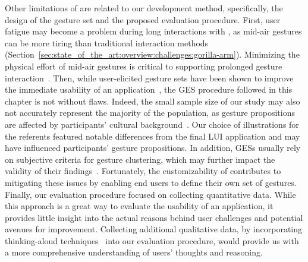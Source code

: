 Other limitations of \lui are related to our development method, specifically, the design of the gesture set and the proposed evaluation procedure.
%
First, user fatigue may become a problem during long interactions with \lui, as mid-air gestures can be more tiring than traditional interaction methods~\cite{Siddhpuria:2017,Jakobsen:2015,Hansberger:2017} (Section~\ref{sec:state_of_the_art:overview:challenges:gorilla-arm}). Minimizing the physical effort of mid-air gestures is critical to supporting prolonged gesture interaction~\cite{Hansberger:2017}.
%
Then, while user-elicited gesture sets have been shown to improve the immediate usability of an application~\cite{Wobbrock:2005}, the GES procedure followed in this chapter is not without flaws.
Indeed, the small sample size of our study may also not accurately represent the majority of the population, as gesture propositions are affected by participants' cultural background~\cite{Archer:1997}. 
Our choice of illustrations for the referents featured notable differences from the final LUI application and may have influenced participants' gesture propositions. 
In addition, GESs usually rely on subjective criteria for gesture clustering, which may further impact the validity of their findings~\cite{Vatavu:2019}. 
Fortunately, the customizability of \lui contributes to mitigating these issues by enabling end users to define their own set of gestures.
%
Finally, our evaluation procedure focused on collecting quantitative data. While this approach is a great way to evaluate the usability of an application, it provides little insight into the actual reasons behind user challenges and potential avenues for improvement. Collecting additional qualitative data, \eg by incorporating thinking-aloud techniques~\cite{vanSomeren:1994} into our evaluation procedure, would provide us with a more comprehensive understanding of users' thoughts and reasoning.


